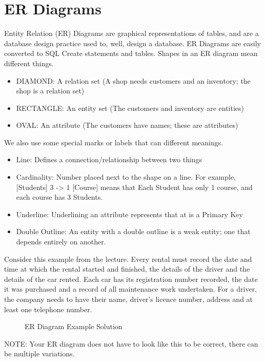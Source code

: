 \section{ER Diagrams}
Entity Relation (ER) Diagrams are graphical representations of tables, and are a database design practice used to, well, design a database. ER Diagrams are easily converted to SQL Create statements and tables. Shapes in an ER diagram mean different things.
\begin{itemize}
	\item DIAMOND: A relation set (A shop needs customers and an inventory; the shop is a relation set)
	\item RECTANGLE: An entity set (The customers and inventory are entities)
	\item OVAL: An attribute (The customers have names; these are attributes)
\end{itemize}
We also use some special marks or labels that can different meanings.
\begin{itemize}
	\item Line: Defines a connection/relationship between two things
	\item Cardinality: Number placed next to the shape on a line. For example, [Students] 3 -> 1 [Course] means that Each Student has only 1 course, and each course has 3 Students.
	\item Underline: Underlining an attribute represents that at is a Primary Key
	\item Double Outline: An entity with a double outline is a weak entity; one that depends entirely on another.
\end{itemize}
Consider this example from the lecture. Every rental must record the date and time at which the rental started and finished, the details of the driver and the details of the car rented. Each car has its registration number recorded, the date it was purchased and a record of all maintenance work undertaken. For a driver, the company needs to have their name, driver’s licence number, address and at least one telephone number. \newline
\begin{figure}[!htb]
	\caption{\label{fig:er} ER Diagram Example Solution}
\end{figure}


NOTE: Your ER diagram does not have to look like this to be correct, there can be multiple variations.